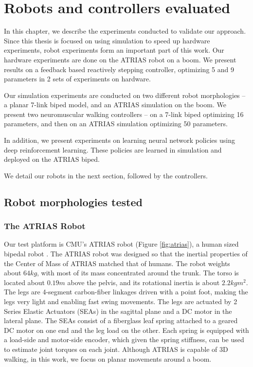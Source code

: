 \chapter{Robots and controllers evaluated}

In this chapter, we describe the experiments conducted to validate our approach. Since this thesis is focused on using simulation to speed up hardware experiments, robot experiments form an important part of this work. Our hardware experiments are done on the ATRIAS robot on a boom. We present results on a feedback based reactively stepping controller, optimizing 5 and 9 parameters in 2 sets of experiments on hardware. 

Our simulation experiments are conducted on two different robot morphologies -- a planar 7-link biped model, and an ATRIAS simulation on the boom. We present two neuromuscular walking controllers -- on a 7-link biped optimizing 16 parameters, and then on an ATRIAS simulation optimizing 50 parameters.

In addition, we present experiments on learning neural network policies using deep reinforcement learning. These policies are learned in simulation and deployed on the ATRIAS biped.

We detail our robots in the next section, followed by the controllers. 

\section{Robot morphologies tested}

\subsection{The ATRIAS Robot}
\label{sec:atrias}
Our test platform is CMU's ATRIAS robot (Figure \ref{fig:atrias}), a human sized bipedal robot \cite{hubicki2016atrias}. The ATRIAS robot was designed so that the inertial properties of the Center of Mass of ATRIAS matched that of humans. The robot weights about $64kg$, with most of its mass concentrated around the trunk. The torso is located about $0.19m$ above the pelvis, and its rotational inertia is about $2.2 kgm^2$. The legs are 4-segment carbon-fiber linkages driven with a point foot, making the legs very light and enabling fast swing movements. The legs are actuated by 2 Series Elastic Actuators (SEAs) in the sagittal plane and a DC motor in the lateral plane. The SEAs consist of a fiberglass leaf spring attached to a geared DC motor on one end and the leg load on the other. Each spring is equipped with a load-side and motor-side encoder, which given the spring stiffness, can be used to estimate joint torques on each joint. 
Although ATRIAS is capable of 3D walking, in this work, we focus on planar movements around a boom.

